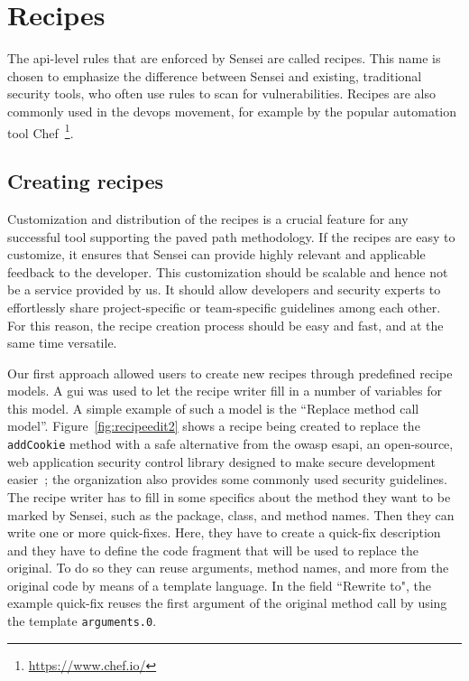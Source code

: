 \section{Recipes}

The \gls{api}-level rules that are enforced by Sensei are called recipes.
This name is chosen to emphasize the difference between Sensei and existing, traditional security tools, who often use rules to scan for vulnerabilities.
Recipes are also commonly used in the \gls{devops} movement, for example by the popular automation tool Chef~\footnote{\url{https://www.chef.io/}}.

\subsection{Creating recipes}
Customization and distribution of the recipes is a crucial feature for any successful tool supporting the paved path methodology.
If the recipes are easy to customize, it ensures that Sensei can provide highly relevant and applicable feedback to the developer.
This customization should be scalable and hence not be a service provided by us.
It should allow developers and security experts to effortlessly share project-specific or team-specific guidelines among each other.
For this reason, the recipe creation process should be easy and fast, and at the same time versatile. 

Our first approach allowed users to create new recipes through predefined recipe models.
A \gls{gui} was used to let the recipe writer fill in a number of variables for this model.
A simple example of such a model is  the ``Replace method call model”.
Figure~\ref{fig:recipeedit2} shows a recipe being created to replace the \texttt{addCookie} method with a safe alternative from the \gls{owasp} \gls{esapi}, an open-source, web application security control library designed to make secure development easier~\cite{ESAPI}; the organization also provides some commonly used security guidelines.
The recipe writer has to fill in some specifics about the method they want to be marked by Sensei, such as the package, class, and method names.
Then they can write one or more quick-fixes.
Here, they have to create a quick-fix description and they have to define the code fragment that will be used to replace the original.
To do so they can reuse arguments, method names, and more from the original code by means of a template language.
In the field ``Rewrite to", the example quick-fix reuses the first argument of the original method call by using the template \texttt{arguments.0}. 

